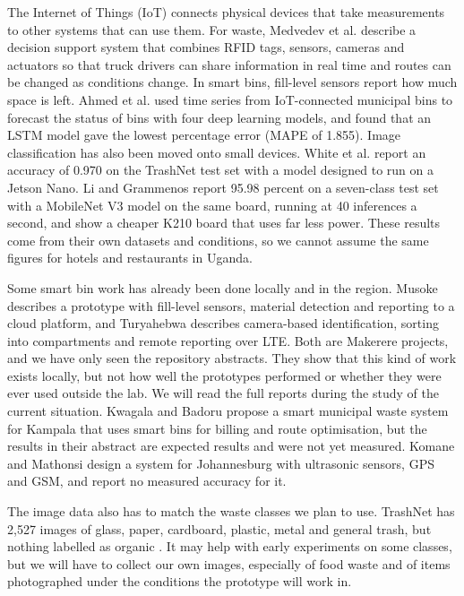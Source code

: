 The Internet of Things (IoT) connects physical devices that take measurements to other systems that can use them. For waste, Medvedev et al. \cite{medvedev} describe a decision support system that combines RFID tags, sensors, cameras and actuators so that truck drivers can share information in real time and routes can be changed as conditions change. In smart bins, fill-level sensors report how much space is left. Ahmed et al. \cite{ahmed} used time series from IoT-connected municipal bins to forecast the status of bins with four deep learning models, and found that an LSTM model gave the lowest percentage error (MAPE of 1.855). Image classification has also been moved onto small devices. White et al. \cite{white} report an accuracy of 0.970 on the TrashNet test set with a model designed to run on a Jetson Nano. Li and Grammenos \cite{li} report 95.98 percent on a seven-class test set with a MobileNet V3 model on the same board, running at 40 inferences a second, and show a cheaper K210 board that uses far less power. These results come from their own datasets and conditions, so we cannot assume the same figures for hotels and restaurants in Uganda.

Some smart bin work has already been done locally and in the region. Musoke \cite{musoke} describes a prototype with fill-level sensors, material detection and reporting to a cloud platform, and Turyahebwa \cite{turyahebwa} describes camera-based identification, sorting into compartments and remote reporting over LTE. Both are Makerere projects, and we have only seen the repository abstracts. They show that this kind of work exists locally, but not how well the prototypes performed or whether they were ever used outside the lab. We will read the full reports during the study of the current situation. Kwagala and Badoru \cite{kwagala} propose a smart municipal waste system for Kampala that uses smart bins for billing and route optimisation, but the results in their abstract are expected results and were not yet measured. Komane and Mathonsi \cite{komane} design a system for Johannesburg with ultrasonic sensors, GPS and GSM, and report no measured accuracy for it.

The image data also has to match the waste classes we plan to use. TrashNet has 2,527 images of glass, paper, cardboard, plastic, metal and general trash, but nothing labelled as organic \cite{yang,white}. It may help with early experiments on some classes, but we will have to collect our own images, especially of food waste and of items photographed under the conditions the prototype will work in.


